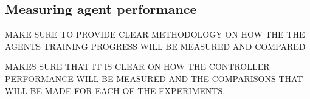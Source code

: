 \subsection{Measuring agent performance}\label{sec:agent_performance}
MAKE SURE TO PROVIDE CLEAR METHODOLOGY ON HOW THE THE AGENTS TRAINING PROGRESS WILL BE MEASURED AND COMPARED

MAKES SURE THAT IT IS CLEAR ON HOW THE CONTROLLER PERFORMANCE WILL BE MEASURED AND THE COMPARISONS THAT WILL BE MADE FOR EACH OF THE EXPERIMENTS.